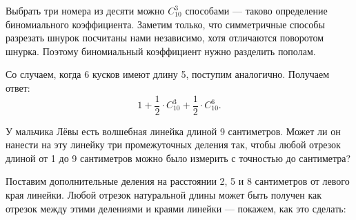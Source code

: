 \begin{itemize}
	Выбрать три номера из десяти можно $C_{10}^3$ способами — таково определение биномиального коэффициента. Заметим только, что симметричные способы разрезать шнурок посчитаны нами независимо, хотя отличаются поворотом шнурка. Поэтому биномиальный коэффициент нужно разделить пополам.
	
	Со случаем, когда 6 кусков имеют длину 5, поступим аналогично. Получаем ответ:
	$$1 + \frac{1}{2} \cdot C_{10}^3 + \frac{1}{2} \cdot C_{10}^6.$$
	
	\itC У мальчика Лёвы есть волшебная линейка длиной 9 сантиметров. Может ли он нанести на эту линейку три промежуточных деления так, чтобы любой отрезок длиной от 1 до 9 сантиметров можно было измерить с точностью до сантиметра?
	
	\itr Поставим дополнительные деления на расстоянии 2, 5 и 8 сантиметров от левого края линейки. Любой отрезок натуральной длины может быть получен как отрезок между этими делениями и краями линейки — покажем, как это сделать:

	

\end{itemize}


